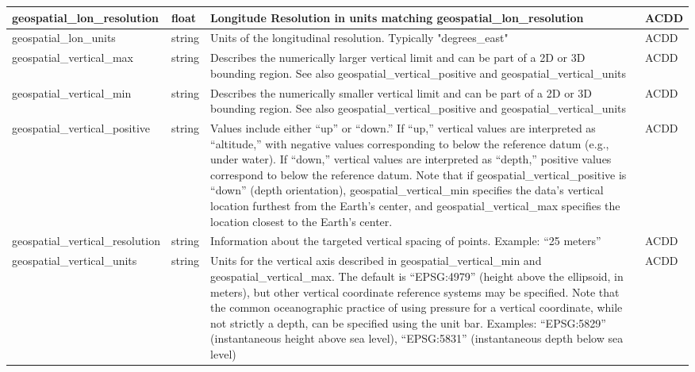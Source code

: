 \begin{longtable}{|p{}|p{}|p{}|p{}|}
\rowcolor{cyan!25} 
geospatial\_lon\_resolution & float & Longitude Resolution in units matching geospatial\_lon\_resolution & ACDD \\ \hline

\rowcolor{cyan!25} 
geospatial\_lon\_units & string & Units of the longitudinal resolution. Typically "degrees\_east" & ACDD \\ \hline

\rowcolor{cyan!25} 
geospatial\_vertical\_max & string & Describes the numerically larger vertical limit and can be part of a 2D or 3D bounding region.  See also geospatial\_vertical\_positive and geospatial\_vertical\_units & ACDD \\ \hline

\rowcolor{cyan!25} 
geospatial\_vertical\_min & string & Describes the numerically smaller vertical limit and can be part of a 2D or 3D bounding region.  See also geospatial\_vertical\_positive and geospatial\_vertical\_units & ACDD \\ \hline

\rowcolor{cyan!25} 
geospatial\_vertical\_positive & string & Values include either “up” or “down.” If “up,” vertical values are interpreted as “altitude,” with negative values corresponding to below the reference datum (e.g., under water). If “down,” vertical values are interpreted as “depth,” positive values correspond to below the reference datum. Note that if geospatial\_vertical\_positive is “down” (depth orientation), geospatial\_vertical\_min specifies the data’s vertical location furthest from the Earth’s center, and geospatial\_vertical\_max specifies the location closest to the Earth’s center. & ACDD \\ \hline

\rowcolor{cyan!25} 
geospatial\_vertical\_resolution & string & Information about the targeted vertical spacing of points. Example: “25 meters” & ACDD \\ \hline

\rowcolor{cyan!25} 
geospatial\_vertical\_units & string & Units for the vertical axis described in geospatial\_vertical\_min and geospatial\_vertical\_max. The default is “EPSG:4979” (height above the ellipsoid, in meters), but other vertical coordinate reference systems may be specified. Note that the common oceanographic practice of using pressure for a vertical coordinate, while not strictly a depth, can be specified using the unit bar. Examples: “EPSG:5829” (instantaneous height above sea level), “EPSG:5831” (instantaneous depth below sea level) & ACDD \\ \hline


\end{longtable}
